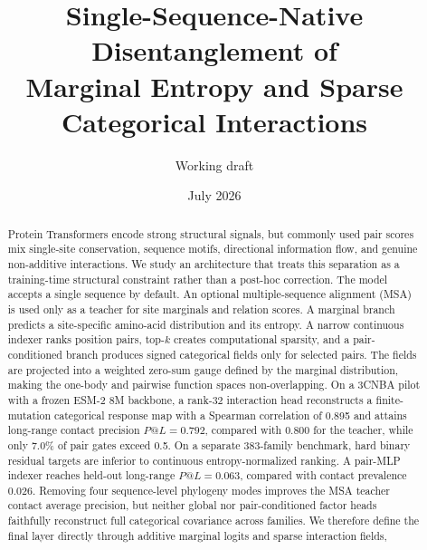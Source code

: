 \documentclass[10pt]{article}
\title{Single-Sequence-Native Disentanglement of\\Marginal Entropy and Sparse Categorical Interactions}
\author{Working draft}
\date{July 2026}
\begin{document}
\maketitle

\begin{center}
\end{center}

\begin{abstract}
Protein Transformers encode strong structural signals, but commonly used pair scores mix
single-site conservation, sequence motifs, directional information flow, and genuine
non-additive interactions.  We study an architecture that treats this separation as a
training-time structural constraint rather than a post-hoc correction.  The model accepts a
single sequence by default.  An optional multiple-sequence alignment (MSA) is used only as a
teacher for site marginals and relation scores.  A marginal branch predicts a site-specific
amino-acid distribution and its entropy.  A narrow continuous indexer ranks position pairs,
top-$k$ creates computational sparsity, and a pair-conditioned branch produces signed
categorical fields only for selected pairs.  The fields are projected into a weighted zero-sum
gauge defined by the marginal distribution, making the one-body and pairwise function spaces
non-overlapping.  On a 3CNBA pilot with a frozen ESM-2 8M backbone, a
rank-32 interaction head reconstructs a finite-mutation categorical response map with a
Spearman correlation of 0.895 and attains long-range contact precision $P@L=0.792$, compared
with $0.800$ for the teacher, while only 7.0\% of pair gates exceed 0.5.  On a separate
383-family benchmark, hard binary residual targets are inferior to continuous
entropy-normalized ranking.  A pair-MLP indexer reaches held-out long-range $P@L=0.063$,
compared with contact prevalence 0.026.  Removing four sequence-level phylogeny modes
improves the MSA teacher contact average precision, but neither global nor pair-conditioned
factor heads faithfully reconstruct full categorical covariance across families.  We therefore
define the final layer directly through additive marginal logits and sparse interaction fields,

\end{abstract}
\end{document}
